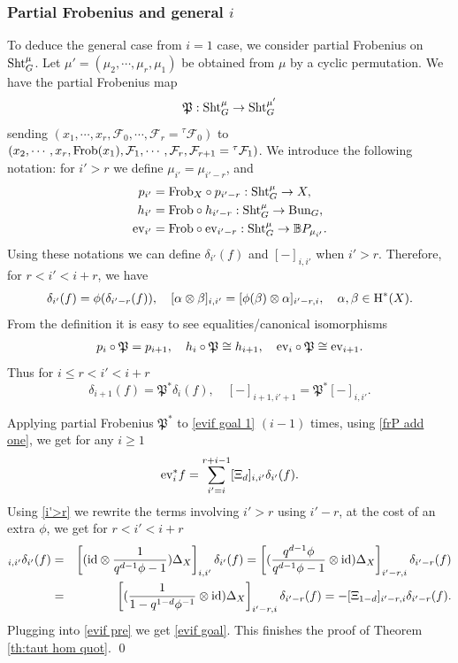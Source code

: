 \documentclass[reqno]{amsart}
\numberwithin{equation}{subsection}
\theoremstyle{definition}
\def\BB{\mathbb{B}}
\newcommand\cF{\mathcal{F}}
\newcommand\frP{\mathfrak{P}}
\newcommand{\Bun}{\textup{Bun}}
\newcommand\ev{\textup{ev}}
\newcommand\Frob{\textup{Frob}}
\newcommand\id{\textup{id}}
\newcommand\Sht{\textup{Sht}}
\newcommand\ot{\otimes}
\renewcommand\c\circ
\newcommand{\cohog}[2]{\textup{H}^{#1}({#2})}     %
\renewcommand\a\alpha
\renewcommand\b\beta
\renewcommand\d\delta
\newcommand\D\Delta
\renewcommand{\t}{\tau}
\begin{document}
\subsubsection{Partial Frobenius and general $i$}
To deduce the general case from $i=1$ case, we consider partial Frobenius on $\Sht^\mu_G$. Let $\mu'=(\mu_2,\cdots, \mu_r,\mu_1)$ be obtained from $\mu$ by a cyclic permutation. We have the partial Frobenius map
\begin{equation*}
    \frP: \Sht^\mu_G\to \Sht^{\mu'}_G
\end{equation*}
sending $(x_1,\cdots, x_r, \cF_0,\cdots, \cF_r={}^{\t}\cF_0)$ to $(x_2,\cdots, x_r,\Frob(x_1), \cF_1,\cdots, \cF_r, \cF_{r+1}={}^{\t}\cF_1)$. We introduce the following  notation: for $i'>r$ we define $\mu_{i'}=\mu_{i'-r}$, and
\begin{align*}
    p_{i'} & =\Frob_X\c p_{i'-r}: \Sht^\mu_G\to X,\\
    h_{i'} & =\Frob\c h_{i'-r}: \Sht^\mu_G\to \Bun_G,\\
    \ev_{i'} & =\Frob\c \ev_{i'-r}: \Sht^\mu_G\to \BB P_{\mu_{i'}}.
\end{align*}
Using these notations we can define $\d_{i'}(f)$ and $[-]_{i,i'}$ when $i'>r$.
Therefore, for $r<i'<i+r$, we have
\begin{equation}\label{i'>r}
    \d_{i'}(f)=\phi(\d_{i'-r}(f)),\quad [\a\ot \b]_{i,i'}=[\phi(\b)\ot \a]_{i'-r,i}, \quad \a,\b\in \cohog{*}{X}.
\end{equation}
From the definition it is easy to see equalities/canonical isomorphisms
\begin{eqnarray}\label{pf}
    p_i\c\frP=p_{i+1}, \quad h_i\c\frP\cong h_{i+1}, \quad \ev_i\c\frP\cong \ev_{i+1}.
\end{eqnarray}
Thus for $i\le r<i'<i+r$
\begin{equation}\label{frP add one}
    \d_{i+1}(f)=\frP^*\d_i(f), \quad [-]_{i+1,i'+1}=\frP^*[-]_{i,i'}.
\end{equation}

Applying partial Frobenius $\frP^{*}$ to \eqref{evif goal 1} $(i-1)$ times, using \eqref{frP add one}, we get for any $i\ge1$
\begin{eqnarray}\label{evif pre}
\ev_i^*f=\sum_{i'=i}^{r+i-1}[\Xi_d]_{i,i'} \d_{i'}(f).
\end{eqnarray}
Using \eqref{i'>r} we rewrite the terms involving $i'>r$ using $i'-r$, at the cost of an extra $\phi$, we get for $r<i'<i+r$
\begin{eqnarray*}
    [\Xi_d]_{i,i'}\d_{i'}(f)&=&\left[(\id\ot \frac{1}{q^{d-1}\phi-1})\D_X\right]_{i,i'} \d_{i'}(f)=\left[(\frac{q^{d-1}\phi}{q^{d-1}\phi-1}\ot\id)\D_X\right]_{i'-r,i}\d_{i'-r}(f)\\
    &=&\left[(\frac{1}{1-q^{1-d}\phi^{-1}}\ot\id)\D_X\right]_{i'-r,i}\d_{i'-r}(f)=-[\Xi_{1-d}]_{i'-r,i}\d_{i'-r}(f).
\end{eqnarray*}
Plugging into \eqref{evif pre} we get \eqref{evif goal}. This finishes the proof of Theorem \ref{th:taut hom quot}.
\qed
\end{document}
